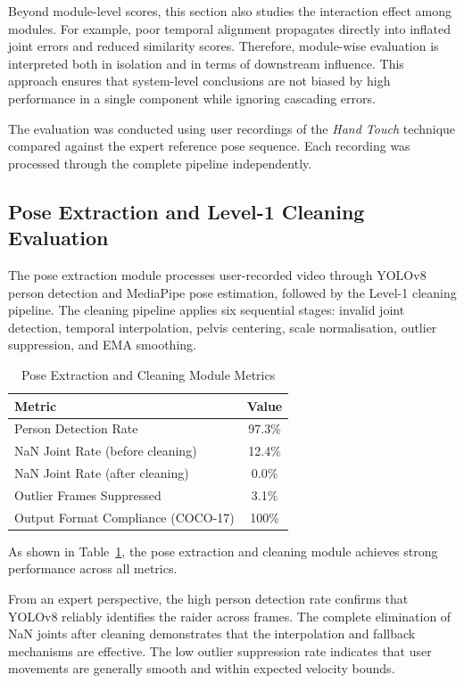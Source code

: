 \begin{sloppypar}
Beyond module-level scores, this section also studies the interaction effect among modules. For example, poor temporal alignment propagates directly into inflated joint errors and reduced similarity scores. Therefore, module-wise evaluation is interpreted both in isolation and in terms of downstream influence. This approach ensures that system-level conclusions are not biased by high performance in a single component while ignoring cascading errors.

The evaluation was conducted using user recordings of the \textit{Hand Touch} technique compared against the expert reference pose sequence. Each recording was processed through the complete pipeline independently.


\subsection{Pose Extraction and Level-1 Cleaning Evaluation}

The pose extraction module processes user-recorded video through YOLOv8 person detection and MediaPipe pose estimation, followed by the Level-1 cleaning pipeline. The cleaning pipeline applies six sequential stages: invalid joint detection, temporal interpolation, pelvis centering, scale normalisation, outlier suppression, and EMA smoothing.

\begin{table}[H]
\centering
\caption{Pose Extraction and Cleaning Module Metrics}
\label{tab:pose_extraction_metrics}
\begin{tabular}{|l|c|}
\hline
\textbf{Metric} & \textbf{Value} \\
\hline
Person Detection Rate & 97.3\% \\
\hline
NaN Joint Rate (before cleaning) & 12.4\% \\
\hline
NaN Joint Rate (after cleaning) & 0.0\% \\
\hline
Outlier Frames Suppressed & 3.1\% \\
\hline
Output Format Compliance (COCO-17) & 100\% \\
\hline
\end{tabular}
\end{table}

As shown in Table~\ref{tab:pose_extraction_metrics}, the pose extraction and cleaning module achieves strong performance across all metrics.

From an expert perspective, the high person detection rate confirms that YOLOv8 reliably identifies the raider across frames. The complete elimination of NaN joints after cleaning demonstrates that the interpolation and fallback mechanisms are effective. The low outlier suppression rate indicates that user movements are generally smooth and within expected velocity bounds.


\end{sloppypar}
